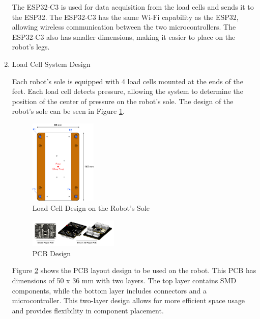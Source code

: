 \begin{enumerate}[label=\Alph*.]
    \hspace*{1em} The ESP32-C3 is used for data acquisition from the load cells and sends it to the ESP32. The ESP32-C3 has the same Wi-Fi capability as the ESP32, allowing wireless communication between the two microcontrollers. The ESP32-C3 also has smaller dimensions, making it easier to place on the robot's legs. 

    \item Load Cell System Design
    \label{subsec:loadcellsystemdesign}

    \hspace*{1em} Each robot's sole is equipped with 4 load cells mounted at the ends of the feet. Each load cell detects pressure, allowing the system to determine the position of the center of pressure on the robot's sole. The design of the robot's sole can be seen in Figure \ref{fig:Dia_LoadCell}.

    \begin{figure} [h] \centering
        \includegraphics[width=0.3\textwidth]{gambar/Diagram_LoadCell.png}
        \caption{Load Cell Design on the Robot's Sole}
        \label{fig:Dia_LoadCell}
    \end{figure}
    
    \begin{figure} [h] \centering
      \includegraphics[width=0.4\textwidth]{gambar/Desain_PCB.png}
      \caption{PCB Design}
      \label{fig:Desain_PCB}
    \end{figure}

    \hspace*{1em} Figure \ref{fig:Desain_PCB} shows the PCB layout design to be used on the robot. This PCB has dimensions of 50 x 36 mm with two layers. The top layer contains SMD components, while the bottom layer includes connectors and a microcontroller. This two-layer design allows for more efficient space usage and provides flexibility in component placement.  


\end{enumerate}
